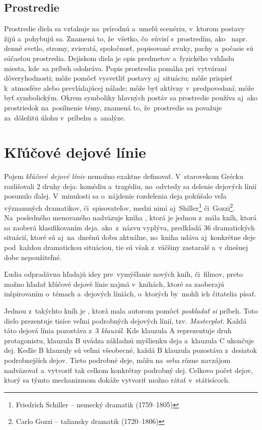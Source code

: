 \subsection*{Prostredie}
Prostredie diela sa vzťahuje na~prírodnú a~umelú scenériu, v~ktorom postavy žijú a~pohybujú sa. Znamená to, že~všetko, čo~súvisí s~prostredím, ako~ napr. denné svetlo, stromy, zvieratá, spoločnosť, popisované zvuky, pachy a~počasie sú súčasťou prostredia. Dejiskom diela je opis predmetov a~fyzického vzhľadu miesta, kde~sa príbeh odohráva.
Popis prostredia pomáha pri~vytváraní dôveryhodnosti; môže pomôcť vysvetliť postavy aj~situáciu; môže prispieť k~atmosfére alebo prevládajúcej nálade; môže byť aktívny v~predpovedaní; môže byť symbolickým. Okrem symboliky hlavných postáv sa prostredie používa aj~ako prostriedok na~posilnenie témy, znamená to, že~prostredie sa považuje za~dôležitú úlohu v~príbehu a~analýze.


\section{Kľúčové dejové línie}
\label{kdl}
Pojem \textit{kľúčové dejové línie} nemožno exaktne definovať. V~starovekom Grécku rozlišovali 2 druhy deja: komédiu a~tragédiu, no~odvtedy sa delenie dejových línií posunulo ďalej. V~minulosti sa o~nájdenie rozdelenia deja pokúšalo veľa významných dramatikov, či~spisovateľov, medzi nimi aj~Shiller\footnote{Friedrich Schiller -- nemecký dramatik (1759--1805)} či~Gozzi\footnote{Carlo Gozzi -- taliansky dramatik (1720--1806)}. Na~posledného menovaného nadväzuje kniha  \cite{Polti:1921}, ktorá je jednou z~mála kníh, ktorá sa zaoberá klasifikovaním deja. ako~z~názvu vyplýva, predkladá 36 dramatických situácií, ktoré sú aj~na~dnešnú dobu aktuálne, no~kniha udáva aj~konkrétne deje pod~každou dramatickou situáciou, tie sú však z~väčšiny zastaralé a~v dnešnej dobe nepoužiteľné.

Ľudia odpradávna hľadajú idey pre~vymýšľanie nových kníh, či~filmov, preto možno hľadať kľúčové dejové línie najmä v~knihách, ktoré sa zaoberajú inšpirovaním o~témach a~dejových líniách, o~ktorých by~mohli ich čitatelia písať. 

Jednou z~takýchto kníh je  \cite{Cook:1928}, ktorá mala autorom pomôcť \textit{poskladať si} príbeh. Toto dielo prezentuje tisíce veľmi podrobných dejových línií, tzv. \textit{Masterplot}. Každá táto dejová línia pozostáva z~3 \textit{klauzúl}. Kde klauzula A reprezentuje druh protagonistu, klauzula B uvádza základnú myšlienku deja a~klauzula C ukončuje dej. Keďže B klauzuly sú veľmi všeobecné, každá B klauzula pozostáva z~desiatok podrobnejších dejov. Tieto podrobné deje, môžu na~seba rôzne navzájom nadväzovať a~vytvoriť tak celkom konkrétny podrobný dej. Celkovo počet dejov, ktorý sa týmto mechanizmom dokáže vytvoriť možno rátať v~státisícoch.

